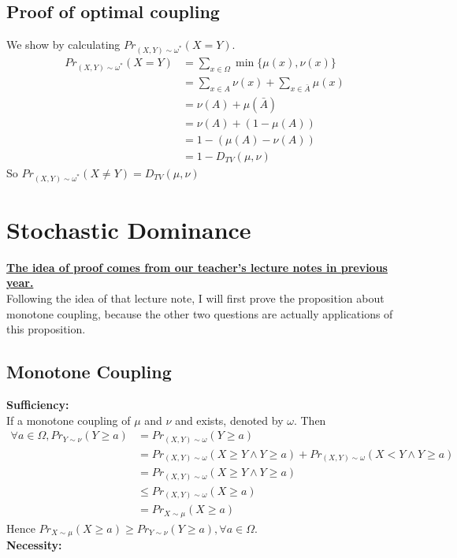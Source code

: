 \documentclass[12pt,letterpaper]{article}
\begin{document}
\subsection{Proof of optimal coupling}
We show by calculating $Pr_{(X,Y)\sim\omega^*}(X=Y)$.\\
\begin{align}
  Pr_{(X,Y)\sim\omega^*}(X=Y)&=\sum_{x\in\Omega}\min\{\mu(x),\nu(x)\}\\
  &=\sum_{x\in A}\nu(x)+\sum_{x\in\bar{A}}\mu(x)\\
  &=\nu(A)+\mu(\bar{A})\\
  &=\nu(A)+(1-\mu(A))\\
  &=1-(\mu(A)-\nu(A))\\
  &=1-D_{TV}(\mu,\nu)
\end{align}
So $Pr_{(X,Y)\sim\omega^*}(X\neq Y)=D_{TV}(\mu,\nu)$
\newpage 


\section{Stochastic Dominance}
\textbf{\underline{The idea of proof comes from our teacher's lecture notes in previous year.}}\\
Following the idea of that lecture note, I will first prove the proposition about monotone coupling, because the other two questions are actually applications of this proposition.

\subsection{Monotone Coupling}
\textbf{Sufficiency:}\\
If a monotone coupling of $\mu$ and $\nu$ and exists, denoted by $\omega$. Then 
\begin{align}
  \forall a\in\Omega, Pr_{Y\sim\nu}(Y\geq a)&=Pr_{(X,Y)\sim\omega}(Y\geq a)\\
  &=Pr_{(X,Y)\sim\omega}(X\geq Y\wedge Y\geq a)+Pr_{(X,Y)\sim\omega}(X < Y\wedge Y\geq a)\\
  &=Pr_{(X,Y)\sim\omega}(X\geq Y\wedge Y\geq a)\\
  &\leq Pr_{(X,Y)\sim\omega}(X\geq a)\\
  &=Pr_{X\sim\mu}(X\geq a)
\end{align}
Hence $Pr_{X\sim\mu}(X\geq a)\geq Pr_{Y\sim\nu}(Y\geq a),\forall a\in\Omega$.\\
\textbf{Necessity:}
\end{document}
